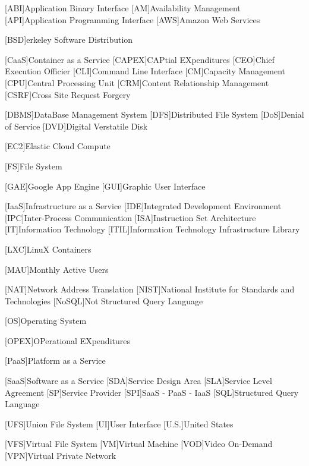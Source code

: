 %
%
[ABI]{Application Binary Interface}
[AM]{Availability Management}
[API]{Application Programming Interface}
[AWS]{Amazon Web Services}

[BSD]{erkeley Software Distribution}

[CaaS]{Container as a Service}
[CAPEX]{CAPtial EXpenditures}
[CEO]{Chief Execution Officier}
[CLI]{Command Line Interface}
[CM]{Capacity Management}
[CPU]{Central Processing Unit}
[CRM]{Content Relationship Management}
[CSRF]{Cross Site Request Forgery}

[DBMS]{DataBase Management System}
[DFS]{Distributed File System}
[DoS]{Denial of Service}
[DVD]{Digital Verstatile Disk}

[EC2]{Elastic Cloud Compute}

[FS]{File System}

[GAE]{Google App Engine}
[GUI]{Graphic User Interface}

[IaaS]{Infrastructure as a Service}
[IDE]{Integrated Development Environment}
[IPC]{Inter-Process Communication}
[ISA]{Instruction Set Architecture}
[IT]{Information Technology}
[ITIL]{Information Technology Infrastructure Library}

[LXC]{LinuX Containers}

[MAU]{Monthly Active Users}

[NAT]{Network Address Translation}
[NIST]{National Institute for Standards and Technologies}
[NoSQL]{Not Structured Query Language}

[OS]{Operating System}

[OPEX]{OPerational EXpenditures}

[PaaS]{Platform as a Service}

[SaaS]{Software as a Service}
[SDA]{Service Design Area}
[SLA]{Service Level Agreement}
[SP]{Service Provider}
[SPI]{SaaS - PaaS - IaaS}
[SQL]{Structured Query Language}

[UFS]{Union File System}
[UI]{User Interface}
[U.S.]{United States}

[VFS]{Virtual File System}
[VM]{Virtual Machine}
[VOD]{Video On-Demand}
[VPN]{Virtual Private Network}
